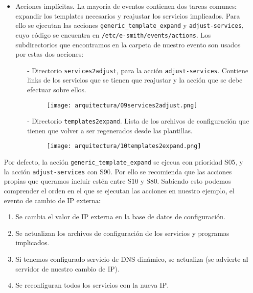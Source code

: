 \begin{itemize}

\item Acciones implícitas. La mayoría de eventos contienen dos tareas comunes: expandir los templates necesarios y reajustar los servicios implicados. Para ello se ejecutan las acciones \lstinline!generic_template_expand! y \lstinline!adjust-services!, cuyo código se encuentra en \lstinline!/etc/e-smith/events/actions!. Los subdirectorios que encontramos en la carpeta de nuestro evento son usados por estas dos acciones:

\begin{itemize}

\item[-] Directorio \lstinline!services2adjust!, para la acción \lstinline!adjust-services!. Contiene links de los servicios que se tienen que reajustar y la acción que se debe efectuar sobre ellos.

\begin{figure}[H]
    \centering
    \texttt{[image: arquitectura/09services2adjust.png]}
\end{figure}

\item[-] Directorio \lstinline!templates2expand!. Lista de los archivos de configuración que tienen que volver a ser regenerados desde las plantillas.

\begin{figure}[H]
    \centering
    \texttt{[image: arquitectura/10templates2expand.png]}
\end{figure}
\end{itemize}
\end{itemize}

Por defecto, la acción \lstinline!generic_template_expand! se ejecua con prioridad S05, y la acción \lstinline!adjust-services! con S90. Por ello se recomienda que las acciones propias que queramos incluir estén entre S10 y S80. Sabiendo esto podemos comprender el orden en el que se ejecutan las acciones en nuestro ejemplo, el evento de cambio de IP externa:
\begin{enumerate}
\item Se cambia el valor de IP externa en la base de datos de configuración.
\item Se actualizan los archivos de configuración de los servicios y programas implicados.
\item Si tenemos configurado servicio de DNS dinámico, se actualiza (se advierte al servidor de nuestro cambio de IP).
\item Se reconfiguran todos los servicios con la nueva IP.
\end{enumerate}

